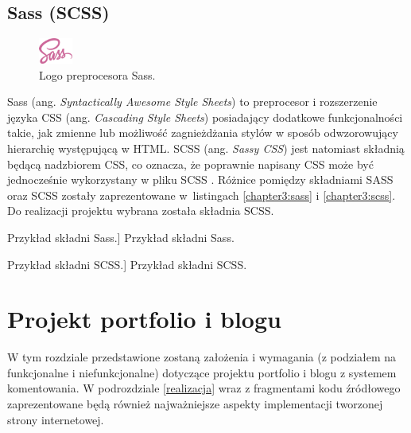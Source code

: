 \documentclass[a4paper, 12pt]{article}
\numberwithin{figure}{section}
\begin{document}
\begin{sloppypar}

\subsection*{Sass (SCSS)}

\begin{figure}[H] 
    \centering
        \includegraphics[width=0.1\textwidth]{images/sass-logo.png}
   \caption{Logo preprocesora Sass.}
\end{figure}

Sass (ang. \textit{Syntactically Awesome Style Sheets}) to preprocesor i rozszerzenie języka CSS (ang. \textit{Cascading Style Sheets}) posiadający dodatkowe funkcjonalności takie, jak zmienne lub możliwość zagnieżdżania stylów w sposób odwzorowujący hierarchię występującą w HTML. SCSS (ang. \textit{Sassy CSS}) jest natomiast składnią będącą nadzbiorem CSS, co oznacza, że poprawnie napisany CSS może być jednocześnie wykorzystany w pliku SCSS \cite{sass}. Różnice pomiędzy składniami SASS oraz SCSS zostały zaprezentowane w~listingach \ref{chapter3:sass} i \ref{chapter3:scss}. Do realizacji projektu wybrana została składnia SCSS.\newline
\begin{code}[htbp]
    
    \caption
    [Przykład składni Sass.]
    {Przykład składni Sass.}
    \label{chapter3:sass}
\end{code}

\begin{code}[htbp]
    
    \caption
    [Przykład składni SCSS.]
    {Przykład składni SCSS.}
    \label{chapter3:scss}
\end{code}


\clearpage

\section{Projekt portfolio i blogu} \label{wymagania}
W tym rozdziale przedstawione zostaną założenia i wymagania (z podziałem na funkcjonalne i niefunkcjonalne) dotyczące projektu portfolio i blogu z systemem komentowania. W podrozdziale \ref{realizacja} wraz z fragmentami kodu źródłowego zaprezentowane będą również najważniejsze aspekty implementacji tworzonej strony internetowej.
 

\end{sloppypar}
\end{document}
